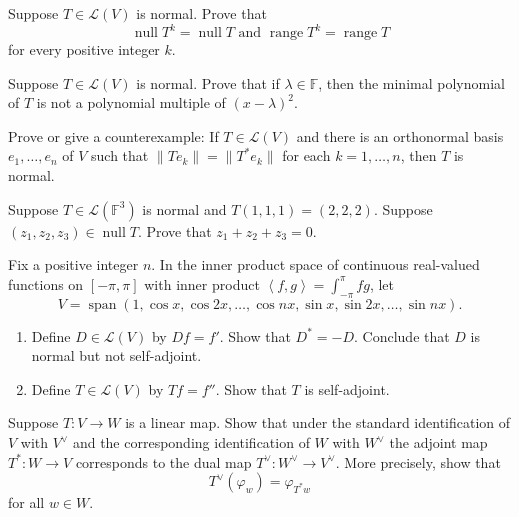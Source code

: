 \documentclass[12 pt, letterpaper]{hmcpset}
\begin{document}
\pagebreak

\begin{problem}[27]
	Suppose $T \in \mathcal{L}(V)$ is normal. Prove that
	\[
		\operatorname{null} T^{k} = \operatorname{null} T \text{ and } \operatorname{range} T^{k} = \operatorname{range} T
	\]
	for every positive integer $k$.
\end{problem}

\pagebreak

\begin{problem}[28]
	Suppose $T \in \mathcal{L}(V)$ is normal. Prove that if $\lambda \in \mathbb{F}$, then the minimal polynomial of $T$ is not a polynomial multiple of $(x - \lambda)^{2}$.
\end{problem}

\pagebreak

\begin{problem}[29]
	Prove or give a counterexample: If $T \in \mathcal{L}(V)$ and there is an orthonormal basis $e_{1}, \dots, e_{n}$ of $V$ such that $\lVert T e_{k} \rVert = \lVert T^{*} e_{k} \rVert$ for each $k = 1, \dots, n$, then $T$ is normal.
\end{problem}

\pagebreak

\begin{problem}[30]
	Suppose $T \in \mathcal{L}(\mathbb{F}^{3})$ is normal and $T(1, 1, 1) = (2, 2, 2)$. Suppose $(z_{1}, z_{2}, z_{3}) \in \operatorname{null} T$. Prove that $z_{1} + z_{2} + z_{3} = 0$.
\end{problem}

\pagebreak

\begin{problem}[31]
	Fix a positive integer $n$. In the inner product space of continuous real-valued functions on  $[-\pi, \pi]$ with inner product $\left < f, g \right > = \int_{- \pi}^{\pi} fg$, let
	\[
		V = \operatorname{span}(1, \cos{x}, \cos{2x}, \dots, \cos{nx}, \sin{x}, \sin{2x}, \dots, \sin{nx}).
	\]
	\begin{enumerate}
		\item Define $D \in \mathcal{L}(V)$ by $Df = f'$. Show that $D^{*} = - D$. Conclude that $D$ is normal but not self-adjoint.
		\item Define $T \in \mathcal{L}(V)$ by $Tf = f''$. Show that $T$ is self-adjoint.
	\end{enumerate}
\end{problem}

\pagebreak

\begin{problem}[32]
	Suppose $T : V \to W$ is a linear map. Show that under the standard identification of $V$ with $V^{\vee}$ and the corresponding identification of $W$ with $W^{\vee}$ the adjoint map $T^{*} : W \to V$ corresponds to the dual map $T^{\vee} : W^{\vee} \to V^{\vee}$. More precisely, show that
	\[
		T^{\vee}(\varphi_{w}) = \varphi_{T^{*} w}
	\]
	for all $w \in W$.
\end{problem}
\end{document}
